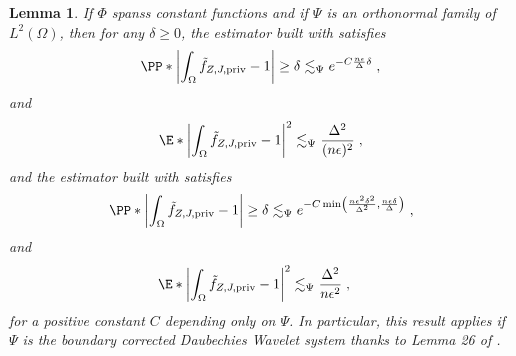 \documentclass{article}
\newcommand{\1}{\mathds{1}}
\DeclarePairedDelimiter{\abs}{\lvert}{\rvert}
\DeclarePairedDelimiter{\paren}{\lparen}{\rparen}
\theoremstyle{plain}
\newtheorem{lemma}{Lemma}[section]
\theoremstyle{definition}
\theoremstyle{remark}
\begin{document}
\begin{lemma}
    \label{lemma:control_normalization_factor}
    If $\Phi$ spanss constant functions and if $\Psi$ is an orthonormal family of $L^2(\Omega)$, then for any $\delta \geq 0$, the estimator built with  satisfies
    \begin{equation}
        \begin{aligned}
            \PP*{\abs*{\int_{\Omega} \tilde{f}_{Z, J, \textrm{priv} } - 1} \geq \delta} \lesssim_{\Psi} 
            e^{- C \frac{n \epsilon}{\Delta} \delta}\;,
        \end{aligned}
    \end{equation}
    and
    \begin{equation}
    \begin{aligned}
        \E*{\abs*{\int_{\Omega} \tilde{f}_{Z, J, \textrm{priv} } - 1}^2} 
       \lesssim_{\Psi} \frac{\Delta^2}{(n \epsilon)^2} \;,
    \end{aligned}
\end{equation}
    and the estimator built with  satisfies
    \begin{equation}
        \begin{aligned}
            \PP*{\abs*{\int_{\Omega} \tilde{f}_{Z, J, \textrm{priv} } - 1} \geq \delta} \lesssim_{\Psi} 
            e^{- C \min \paren*{ \frac{n \epsilon^2 \delta^2}{\Delta^2}, \frac{n \epsilon \delta}{\Delta}} }\;,
        \end{aligned}
    \end{equation}
    and
    \begin{equation}
    \begin{aligned}
        \E*{\abs*{\int_{\Omega} \tilde{f}_{Z, J, \textrm{priv} } - 1}^2} 
        &\lesssim_{\Psi} \frac{\Delta^2}{n \epsilon^2} \;,
    \end{aligned}
\end{equation}
    for a positive constant $C$ depending only on $\Psi$.
    In particular, this result applies if $\Psi$ is the boundary corrected Daubechies Wavelet system thanks to Lemma 26 of \cite{Manole2024Plugin}. 
\end{lemma}
\end{document}
